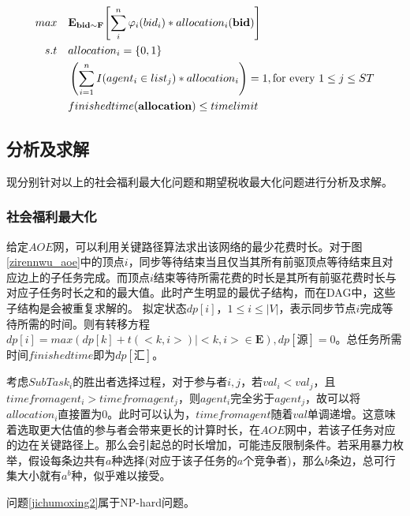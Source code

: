\documentclass[promaster]{thesis-uestc}
\begin{document}
\begin{align}
    \label{jichumoxing2shuishou} 
    max\quad&\mathbf{E}_{\mathbf{bid}\sim\mathbf{F}}{\left[\sum_{i}^{n}{\varphi _i(bid_i)*allocation_i(\mathbf{bid})}\right]}\\
    s.t                     \quad&allocation_i = \{0,1\}\notag\\
    \quad&\left(\sum_{i=1}^{n}{I(agent_i \in list_j)*allocation_i}\right) = 1,\text{for every }1 \leq j \leq ST\notag\\
    \quad&finishedtime(\mathbf{allocation}) \leq timelimit
    \notag
\end{align}

\FloatBarrier

\subsection{分析及求解}
现分别针对以上的社会福利最大化问题和期望税收最大化问题进行分析及求解。
\subsubsection{社会福利最大化}

给定$AOE$网，可以利用关键路径算法求出该网络的最少花费时长。对于图\ref{zirennwu_aoe}中的顶点$i$，同步等待结束当且仅当其所有前驱顶点等待结束且对应边上的子任务完成。而顶点$i$结束等待所需花费的时长是其所有前驱花费时长与对应子任务时长之和的最大值。此时产生明显的最优子结构，而在DAG中，这些子结构是会被重复求解的。
拟定状态$dp[i]，1 \leq i\leq |V|$，表示同步节点$i$完成等待所需的时间。则有转移方程$dp[i] = max(dp[k]+t(<k,i>)|<k,i> \in \mathbf{E}),dp[\text{源}] = 0$。总任务所需时间$finishedtime$即为$dp[\text{汇}]$。


考虑$SubTask_i$的胜出者选择过程，对于参与者$i,j$，若$val_i < val_j$，且$timefromagent_i > timefromagent_j$，则$agent_i$完全劣于$agent_j$，故可以将$allocation_i$直接置为0。此时可以认为，$timefromagent$随着$val$单调递增。这意味着选取更大估值的参与者会带来更长的计算时长，在$AOE$网中，若该子任务对应的边在关键路径上。那么会引起总的时长增加，可能违反限制条件。若采用暴力枚举，假设每条边共有$a$种选择(对应于该子任务的$a$个竞争者)，那么$b$条边，总可行集大小就有$a^b$种，似乎难以接受。

\begin{theorem}
   问题\ref{jichumoxing2}属于NP-hard问题。
\end{theorem}
\end{document}
